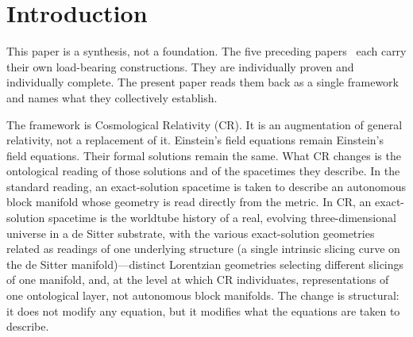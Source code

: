 \documentclass[11pt,a4paper]{article}
\theoremstyle{definition}
\begin{document}
\begin{abstract}
methodological setting in which conceptual logic from minimal geometric premises is the primary mode of argument; (iii) an eight-result evidential constellation in which seven structurally distinct routes converge on the no-horizon-formation conclusion from different angles and an eighth establishes parity with standard general relativity. We inventory the diagnostic apparatus the framework offers (the metric-singularity definition gap; the verb-tense locus of category error; the causal-localization diagnostic; the sweep-pivot artefact), and we close with what the framework leaves open as natural future directions (cross-geometry vantages, dynamics implications, the gravitational-mass question, the cosmogenetic question raised by the Null-Boundary Correspondence, and quantum implications). The framework is the structural augmentation; the five preceding papers are its load-bearing content; this paper names what they collectively establish.
\end{abstract}

\section{Introduction}\label{sec:intro}

This paper is a synthesis, not a foundation. The five preceding papers~\cite{JanzenBHcausality, JanzenCircle, JanzenSlicing, JanzenGroupoid, JanzenCRcosmology} each carry their own load-bearing constructions. They are individually proven and individually complete. The present paper reads them back as a single framework and names what they collectively establish.

The framework is Cosmological Relativity (CR). It is an augmentation of general relativity, not a replacement of it. Einstein's field equations remain Einstein's field equations. Their formal solutions remain the same. What CR changes is the ontological reading of those solutions and of the spacetimes they describe. In the standard reading, an exact-solution spacetime is taken to describe an autonomous block manifold whose geometry is read directly from the metric. In CR, an exact-solution spacetime is the worldtube history of a real, evolving three-dimensional universe in a de Sitter substrate, with the various exact-solution geometries related as readings of one underlying structure (a single intrinsic slicing curve on the de Sitter manifold)---distinct Lorentzian geometries selecting different slicings of one manifold, and, at the level at which CR individuates, representations of one ontological layer, not autonomous block manifolds. The change is structural: it does not modify any equation, but it modifies what the equations are taken to describe.
\end{document}
